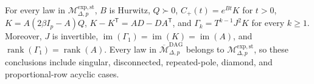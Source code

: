 For every law in \(\mathcal M_{\Delta,p}^{\mathrm{exp,st}}\), \(B\) is Hurwitz, \(Q\succ0\), \(C_{+}(t)=e^{Bt}K\) for \(t>0\), \(K=A(2\beta I_p-A)Q\), \(K-K^{\mathsf T}=AD-DA^{\mathsf T}\), and \(\Gamma_k=T^{k-1}J^2K\) for every \(k\geq1\). Moreover, \(J\) is invertible, \(\operatorname{im}(\Gamma_1)=\operatorname{im}(K)=\operatorname{im}(A)\), and \(\operatorname{rank}(\Gamma_1)=\operatorname{rank}(A)\). Every law in \(\overline{\mathcal M}_{\Delta,p}^{\mathrm{DAG}}\) belongs to \(\mathcal M_{\Delta,p}^{\mathrm{exp,st}}\), so these conclusions include singular, disconnected, repeated-pole, diamond, and proportional-row acyclic cases.